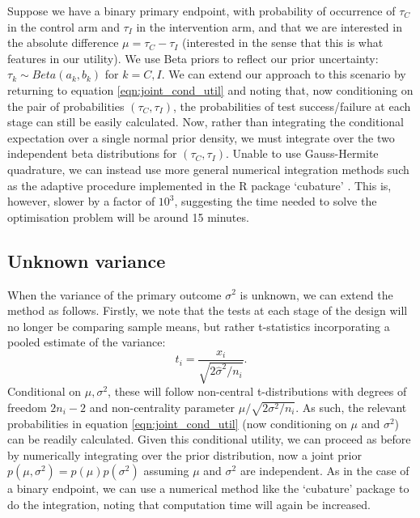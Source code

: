 \documentclass[sagev]{sagej}
\begin{document}
Suppose we have a binary primary endpoint, with probability of occurrence of $\tau_C$ in the control arm and $\tau_I$ in the intervention arm, and that we are interested in the absolute difference $\mu = \tau_C - \tau_I$ (interested in the sense that this is what features in our utility). We use Beta priors to reflect our prior uncertainty: $\tau_k \sim Beta(a_k, b_k)$ for $k = C, I$. We can extend our approach to this scenario by returning to equation \ref{eqn:joint_cond_util} and noting that, now conditioning on the pair of probabilities $(\tau_C, \tau_I)$, the probabilities of test success/failure at each stage can still be easily calculated. Now, rather than integrating the conditional expectation over a single normal prior density, we must integrate over the two independent beta distributions for $(\tau_C, \tau_I)$. Unable to use Gauss-Hermite quadrature, we can instead use more general numerical integration methods such as the adaptive procedure implemented in the R package `cubature' \cite{Narasimhan2018}. This is, however, slower by a factor of $10^3$, suggesting the time needed to solve the optimisation problem will be around 15 minutes.


\subsection{Unknown variance}

When the variance of the primary outcome $\sigma^2$ is unknown, we can extend the method as follows. Firstly, we note that the tests at each stage of the design will no longer be comparing sample means, but rather t-statistics incorporating a pooled estimate of the variance:
$$
t_i = \frac{x_i}{\sqrt{2\hat{\sigma}^2 / n_i}}.
$$
Conditional on $\mu, \sigma^2$, these will follow non-central t-distributions with degrees of freedom $2n_i - 2$ and non-centrality parameter $\mu/\sqrt{2\sigma^2 / n_i}$. As such, the relevant probabilities in equation \ref{eqn:joint_cond_util} (now conditioning on $\mu$ and $\sigma^2$) can be readily calculated. Given this conditional utility, we can proceed as before by numerically integrating over the prior distribution, now a joint prior $p(\mu, \sigma^2) = p(\mu)p(\sigma^2)$ assuming $\mu$ and $\sigma^2$ are independent. As in the case of a binary endpoint, we can use a numerical method like the `cubature' package to do the integration, noting that computation time will again be increased.
\end{document}
